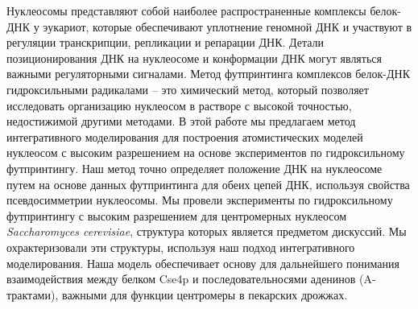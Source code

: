 
Нуклеосомы представляют собой наиболее распространенные комплексы белок-ДНК у эукариот, которые обеспечивают уплотнение геномной ДНК и участвуют в регуляции транскрипции, репликации и репарации ДНК. Детали позиционирования ДНК на нуклеосоме и конформации ДНК могут являться важными регуляторными сигналами. Метод футпринтинга комплексов белок-ДНК гидроксильными радикалами -- это химический метод, который позволяет исследовать организацию нуклеосом в растворе с высокой точностью, недостижимой другими методами. В этой работе мы предлагаем метод интегративного моделирования для построения атомистических моделей нуклеосом с высоким разрешением на основе экспериментов по гидроксильному футпринтингу. Наш метод точно определяет положение ДНК на нуклеосоме путем на основе данных футпринтинга для обеих цепей ДНК, используя свойства псевдосимметрии нуклеосомы. Мы провели эксперименты по гидроксильному футпринтингу с высоким разрешением для центромерных нуклеосом \textit{Saccharomyces cerevisiae}, структура которых является предметом дискуссий. Мы охрактеризовали эти структуры, используя наш подход интегративного моделирования. Наша модель обеспечивает основу для дальнейшего понимания взаимодействия между белком Cse4p и последовательносями аденинов (A-трактами), важными для функции центромеры в пекарских дрожжах.

